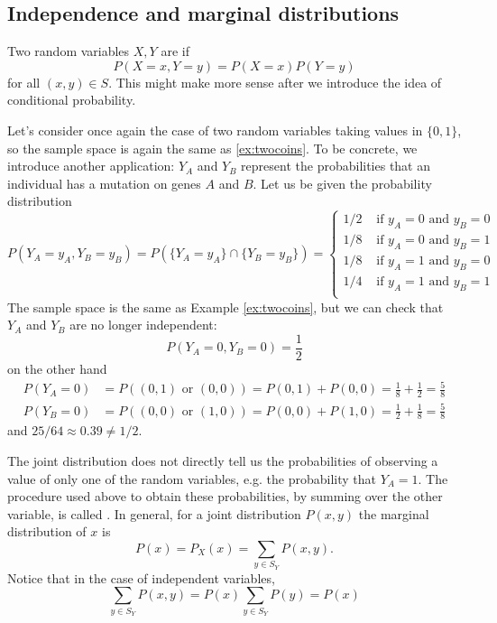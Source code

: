 \subsection{Independence and marginal distributions}
Two random variables $X,Y$ are  if 
\begin{equation}
P(X=x,Y=y) = P(X=x)P(Y=y)
\end{equation}
for all $(x,y) \in S$. This might make more sense after we introduce the idea of conditional probability. 

\begin{example}\label{ex:mut} Let's consider once again the case of two random variables taking values in $\{0,1\}$, so the sample space is again the same as \ref{ex:twocoins}.  To be concrete, we introduce another application: $Y_A$ and $Y_B$ represent the probabilities that an individual has a mutation on genes $A$ and $B$. Let us be given the probability distribution 
\begin{equation*}\label{eq:gene}
P(Y_A = y_A,Y_B=y_B)  = P(\{Y_A = y_A \}\cap \{Y_B=y_B\}) = \left\{ \begin{array}{cc}
1/2 & \text{ if }y_A=0 \text{ and } y_B = 0\\
1/8 & \text{ if }y_A=0 \text{ and } y_B = 1\\
1/8 & \text{ if }y_A=1 \text{ and } y_B = 0\\
1/4 & \text{ if }y_A=1 \text{ and } y_B = 1\\
\end{array}
 \right.
\end{equation*}
The sample space is the same as Example \ref{ex:twocoins}, but we can check that $Y_A$ and $Y_B$ are no longer independent:
\begin{equation*}
P(Y_A=0,Y_B=0) =  \frac{1}{2}
\end{equation*}
on the other hand 
\begin{align*}
P(Y_A=0) &= P((0,1) \text{ or }(0,0)) = P(0,1) + P(0,0) = \frac{1}{8} + \frac{1}{2} =\frac{5}{8} \\
P(Y_B=0) &= P((0,0) \text{ or }(1,0)) = P(0,0) + P(1,0) = \frac{1}{2} + \frac{1}{8}= \frac{5}{8}
\end{align*}
and $25/64  \approx  0.39 \ne 1/2$. 

\end{example}


 The joint distribution does not directly tell us the probabilities of observing a value of only one of the random variables, e.g. the probability that $Y_A = 1$. The procedure used above to obtain these probabilities, by summing over the other variable, is called . In general, for a joint distribution $P(x,y)$ the marginal distribution of $x$ is 
 \begin{equation}
 P(x) = P_X(x) = \sum_{y \in S_Y}P(x,y). 
 \end{equation}
 Notice that in the case of independent variables, 
  \begin{equation}
 \sum_{y \in S_Y}P(x,y) = P(x) \sum_{y \in S_Y}P(y) = P(x)
 \end{equation}
 
